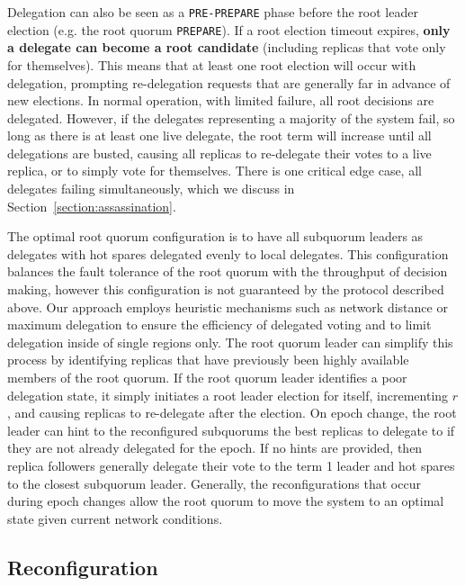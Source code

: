 \documentclass[10pt,conference]{IEEEtran}
\newcommand{\sub}{subquorum\xspace}
\newcommand{\subs}{subquorums\xspace}
\newcommand{\roo}{root quorum\xspace}
\begin{document}
Delegation can also be seen as a \texttt{PRE-PREPARE} phase before the root leader
election (e.g. the root quorum \texttt{PREPARE}).
If a root election timeout expires, \textbf{only a delegate can become a root candidate}
(including replicas that vote only for themselves).
This means that at least one root election will occur with delegation, prompting
re-delegation requests that are generally far in advance of new elections. In normal
operation, with limited failure, all root decisions are delegated.
However, if the delegates representing a majority of the system fail, so long as there
is at least one live delegate, the root term will increase until all delegations are
busted, causing all replicas to re-delegate their votes to a live replica, or to simply
vote for themselves.
There is one critical edge case, all delegates failing simultaneously, which we discuss
in Section~\ref{section:assassination}.

The optimal \roo configuration is to have all \sub leaders as delegates with hot spares
delegated evenly to local delegates.
This configuration balances the fault tolerance of the \roo with the throughput of
decision making, however this configuration is not guaranteed by the protocol described
above.
Our approach employs heuristic mechanisms such as network distance or maximum delegation
to ensure the efficiency of delegated voting and to limit delegation inside of single
regions only.
The \roo leader can simplify this process by identifying replicas that have previously
been highly available members of the root quorum.
If the \roo leader identifies a poor delegation state, it simply initiates a root leader
election for itself, incrementing $r$, and causing replicas to re-delegate after the
election.
On epoch change, the root leader can hint to the reconfigured \subs the best replicas
to delegate to if they are not already delegated for the epoch.
If no hints are provided, then replica followers generally delegate their vote to the
term 1 leader and hot spares to the closest subquorum leader.
Generally, the reconfigurations that occur during epoch changes allow the \roo to move
the system to an optimal state given current network conditions.

\subsection{Reconfiguration}
\label{section:reconfiguration}

\end{document}
